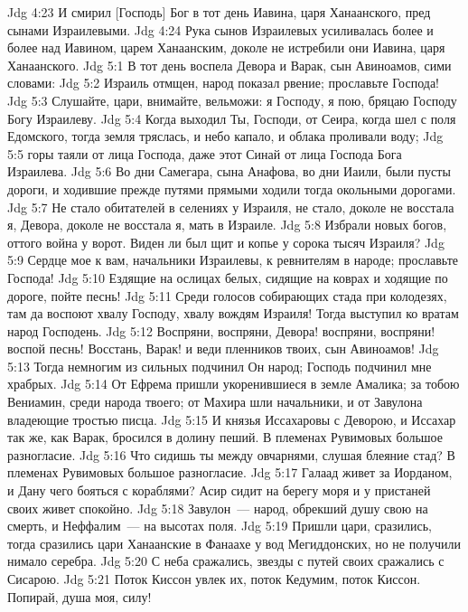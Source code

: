 \rsbpar\vs Jdg 4:23 И смирил [Господь] Бог в тот день Иавина, царя Ханаанского, пред сынами Израилевыми.
\vs Jdg 4:24 Рука сынов Израилевых усиливалась более и более над Иавином, царем Ханаанским, доколе не истребили они Иавина, царя Ханаанского.
\vs Jdg 5:1 В тот день воспела Девора и Варак, сын Авиноамов, сими словами:
\vs Jdg 5:2 Израиль отмщен, народ показал рвение; прославьте Господа!
\vs Jdg 5:3 Слушайте, цари, внимайте, вельможи: я Господу, я пою, бряцаю Господу Богу Израилеву.
\vs Jdg 5:4 Когда выходил Ты, Господи, от Сеира, когда шел с поля Едомского, тогда земля тряслась, и небо капало, и облака проливали воду;
\vs Jdg 5:5 горы таяли от лица Господа, даже этот Синай от лица Господа Бога Израилева.
\vs Jdg 5:6 Во дни Самегара, сына Анафова, во дни Иаили, были пусты дороги, и ходившие прежде путями прямыми ходили тогда окольными дорогами.
\vs Jdg 5:7 Не стало обитателей в селениях у Израиля, не стало, доколе не восстала я, Девора, доколе не восстала я, мать в Израиле.
\vs Jdg 5:8 Избрали новых богов, оттого война у ворот. Виден ли был щит и копье у сорока тысяч Израиля?
\vs Jdg 5:9 Сердце мое к вам, начальники Израилевы, к ревнителям в народе; прославьте Господа!
\vs Jdg 5:10 Ездящие на ослицах белых, сидящие на коврах и ходящие по дороге, пойте песнь!
\vs Jdg 5:11 Среди голосов собирающих стада при колодезях, там да воспоют хвалу Господу, хвалу вождям Израиля! Тогда выступил ко вратам народ Господень.
\vs Jdg 5:12 Воспряни, воспряни, Девора! воспряни, воспряни! воспой песнь! Восстань, Варак! и веди пленников твоих, сын Авиноамов!
\vs Jdg 5:13 Тогда немногим из сильных подчинил Он народ; Господь подчинил мне храбрых.
\vs Jdg 5:14 От Ефрема пришли укоренившиеся в земле Амалика; за тобою Вениамин, среди народа твоего; от Махира шли начальники, и от Завулона владеющие тростью писца.
\vs Jdg 5:15 И князья Иссахаровы с Деворою, и Иссахар так же, как Варак, бросился в долину пеший. В племенах Рувимовых большое разногласие.
\vs Jdg 5:16 Что сидишь ты между овчарнями, слушая блеяние стад? В племенах Рувимовых большое разногласие.
\vs Jdg 5:17 Галаад живет  за Иорданом, и Дану чего бояться с кораблями? Асир сидит на берегу моря и у пристаней своих живет спокойно.
\vs Jdg 5:18 Завулон~--- народ, обрекший душу свою на смерть, и Неффалим~--- на высотах поля.
\vs Jdg 5:19 Пришли цари, сразились, тогда сразились цари Ханаанские в Фанаахе у вод Мегиддонских, но не получили нимало серебра.
\vs Jdg 5:20 С неба сражались, звезды с путей своих сражались с Сисарою.
\vs Jdg 5:21 Поток Киссон увлек их, поток Кедумим, поток Киссон. Попирай, душа моя, силу!
